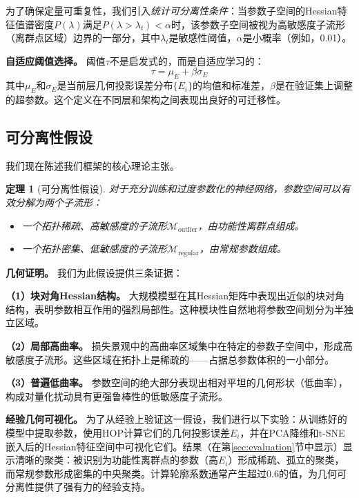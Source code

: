 \documentclass[letterpaper,twocolumn,10pt]{article}
\newtheorem{theorem}{定理}
\begin{document}
为了确保定量可重复性，我们引入\emph{统计可分离性条件}：当参数子空间的Hessian特征值谱密度$P(\lambda)$满足$P(\lambda > \lambda_t) < \alpha$时，该参数子空间被视为高敏感度子流形（离群点区域）边界的一部分，其中$\lambda_t$是敏感性阈值，$\alpha$是小概率（例如，0.01）。

\textbf{自适应阈值选择。} 阈值$\tau$不是启发式的，而是自适应学习的：
\begin{equation}
\tau = \mu_E + \beta \sigma_E
\label{eq:threshold}
\end{equation}
其中$\mu_E$和$\sigma_E$是当前层几何投影误差分布$\{E_i\}$的均值和标准差，$\beta$是在验证集上调整的超参数。这个定义在不同层和架构之间表现出良好的可迁移性。

\subsection{可分离性假设}

我们现在陈述我们框架的核心理论主张。

\begin{theorem}[可分离性假设]
对于充分训练和过度参数化的神经网络，参数空间可以有效分解为两个子流形：
\begin{itemize}
\item 一个拓扑稀疏、高敏感度的子流形$\mathcal{M}_{\text{outlier}}$，由功能性离群点组成。
\item 一个拓扑密集、低敏感度的子流形$\mathcal{M}_{\text{regular}}$，由常规参数组成。
\end{itemize}
\end{theorem}

\textbf{几何证明。} 我们为此假设提供三条证据：

\textbf{（1）块对角Hessian结构。} 大规模模型在其Hessian矩阵中表现出近似的块对角结构\cite{frantar2022gptq}，表明参数相互作用的强烈局部性。这种模块性自然地将参数空间划分为半独立区域。

\textbf{（2）局部高曲率。} 损失景观中的高曲率区域集中在特定的参数子空间中，形成高敏感度子流形。这些区域在拓扑上是稀疏的——占据总参数体积的一小部分。

\textbf{（3）普遍低曲率。} 参数空间的绝大部分表现出相对平坦的几何形状（低曲率），构成对量化扰动具有更强鲁棒性的低敏感度子流形。

\textbf{经验几何可视化。} 为了从经验上验证这一假设，我们进行以下实验：从训练好的模型中提取参数，使用HOP计算它们的几何投影误差$E_i$，并在PCA降维和t-SNE嵌入后的Hessian特征空间中可视化它们。结果（在第\ref{sec:evaluation}节中显示）显示清晰的聚类：被识别为功能性离群点的参数（高$E_i$）形成稀疏、孤立的聚类，而常规参数形成密集的中央聚类。计算轮廓系数通常产生超过0.6的值，为几何可分离性提供了强有力的经验支持。
\end{document}
